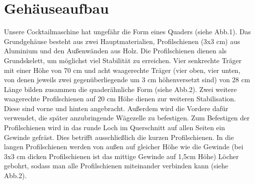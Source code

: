 \documentclass[10pt,a4paper]{report}
\begin{document}
	\section{Gehäuseaufbau}
	Unsere Cocktailmaschine hat ungefähr die Form eines Quaders (siehe Abb.1). Das Grundgehäuse besteht aus zwei Hauptmaterialien, Profilschienen (3x3 cm) aus Aluminium und den Außenwänden aus Holz. Die Profilschienen dienen als Grundskelett, um möglichst viel Stabilität zu erreichen. Vier senkrechte Träger mit einer Höhe von 70 cm und acht waagerechte Träger (vier oben, vier unten, von denen jeweils zwei gegenüberliegende um 3 cm höhenversetzt sind) von 28 cm Länge bilden zusammen die quaderähnliche Form (siehe Abb.2). Zwei weitere waagerechte Profilschienen auf 20 cm Höhe dienen zur weiteren Stabilisation. Diese sind vorne und hinten angebracht. Außerdem wird die Vordere dafür verwendet, die später anzubringende Wägezelle zu befestigen.
	Zum Befestigen der Profilschienen wird in das runde Loch im Querschnitt auf allen Seiten ein Gewinde gefräst. Dies betrifft ausschließlich die kurzen Profilschienen. In die langen Profilschienen werden von außen auf gleicher Höhe wie die Gewinde (bei 3x3 cm dicken Profilschienen ist das mittige Gewinde auf 1,5cm Höhe) Löcher gebohrt, sodass man alle Profilschienen miteinander verbinden kann (siehe Abb.2).  
	
\end{document}
